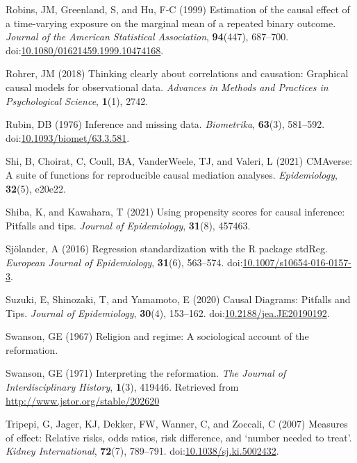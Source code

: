 \documentclass[
  singlecolumn,
  9pt]{article}
\begin{document}
\begin{CSLReferences}
Robins, JM, Greenland, S, and Hu, F-C (1999) Estimation of the causal
effect of a time-varying exposure on the marginal mean of a repeated
binary outcome. \emph{Journal of the American Statistical Association},
\textbf{94}(447), 687--700.
doi:\href{https://doi.org/10.1080/01621459.1999.10474168}{10.1080/01621459.1999.10474168}.

Rohrer, JM (2018) Thinking clearly about correlations and causation:
Graphical causal models for observational data. \emph{Advances in
Methods and Practices in Psychological Science}, \textbf{1}(1), 2742.

Rubin, DB (1976) Inference and missing data. \emph{Biometrika},
\textbf{63}(3), 581--592.
doi:\href{https://doi.org/10.1093/biomet/63.3.581}{10.1093/biomet/63.3.581}.

Shi, B, Choirat, C, Coull, BA, VanderWeele, TJ, and Valeri, L (2021)
CMAverse: A suite of functions for reproducible causal mediation
analyses. \emph{Epidemiology}, \textbf{32}(5), e20e22.

Shiba, K, and Kawahara, T (2021) Using propensity scores for causal
inference: Pitfalls and tips. \emph{Journal of Epidemiology},
\textbf{31}(8), 457463.

Sjölander, A (2016) Regression standardization with the R package
stdReg. \emph{European Journal of Epidemiology}, \textbf{31}(6),
563--574.
doi:\href{https://doi.org/10.1007/s10654-016-0157-3}{10.1007/s10654-016-0157-3}.

Suzuki, E, Shinozaki, T, and Yamamoto, E (2020) Causal Diagrams:
Pitfalls and Tips. \emph{Journal of Epidemiology}, \textbf{30}(4),
153--162.
doi:\href{https://doi.org/10.2188/jea.JE20190192}{10.2188/jea.JE20190192}.

Swanson, GE (1967) Religion and regime: A sociological account of the
reformation.

Swanson, GE (1971) Interpreting the reformation. \emph{The Journal of
Interdisciplinary History}, \textbf{1}(3), 419446. Retrieved from
\url{http://www.jstor.org/stable/202620}

Tripepi, G, Jager, KJ, Dekker, FW, Wanner, C, and Zoccali, C (2007)
Measures of effect: Relative risks, odds ratios, risk difference, and
{`}number needed to treat{'}. \emph{Kidney International},
\textbf{72}(7), 789--791.
doi:\href{https://doi.org/10.1038/sj.ki.5002432}{10.1038/sj.ki.5002432}.


\end{CSLReferences}
\end{document}
